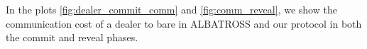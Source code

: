 In the plots \ref{fig:dealer_commit_comm} and \ref{fig:comm_reveal}, we show the communication cost of a dealer to bare 
in ALBATROSS and our protocol in both the commit and reveal phases.





